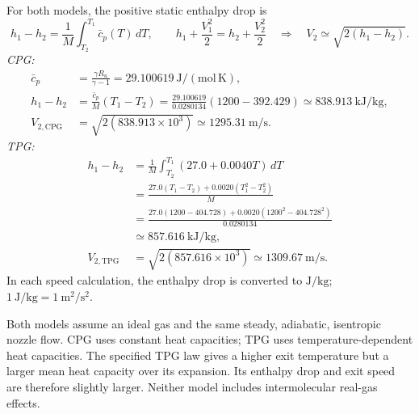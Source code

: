 For both models, the positive static enthalpy drop is
\[
h_1-h_2=\frac{1}{M}\int_{T_2}^{T_1}\bar c_p(T)\,dT,
\qquad
h_1+\frac{V_1^2}{2}=h_2+\frac{V_2^2}{2}
\quad\Longrightarrow\quad V_2\simeq\sqrt{2(h_1-h_2)}.
\]
\textit{CPG:}
\begin{align*}
\bar c_p&=\frac{\gamma R_u}{\gamma-1}
=29.100619\ \mathrm{J/(mol\,K)},\\
h_1-h_2&=\frac{\bar c_p}{M}(T_1-T_2)
=\frac{29.100619}{0.0280134}(1200-392.429)
\simeq\boxed{838.913\ \mathrm{kJ/kg}},\\
V_{2,\mathrm{CPG}}&=\sqrt{2(838.913\times10^3)}
\simeq\boxed{1295.31\ \mathrm{m/s}}.
\end{align*}
\textit{TPG:}
\begin{align*}
h_1-h_2
&=\frac{1}{M}\int_{T_2}^{T_1}(27.0+0.0040T)\,dT\\
&=\frac{27.0(T_1-T_2)+0.0020(T_1^2-T_2^2)}{M}\\
&=\frac{27.0(1200-404.728)+0.0020(1200^2-404.728^2)}{0.0280134}\\
&\simeq\boxed{857.616\ \mathrm{kJ/kg}},\\
V_{2,\mathrm{TPG}}&=\sqrt{2(857.616\times10^3)}
\simeq\boxed{1309.67\ \mathrm{m/s}}.
\end{align*}
In each speed calculation, the enthalpy drop is converted to $\mathrm{J/kg}$;
$1\ \mathrm{J/kg}=1\ \mathrm{m^2/s^2}$.

Both models assume an ideal gas and the same steady, adiabatic, isentropic nozzle flow.
CPG uses constant heat capacities; TPG uses temperature-dependent heat capacities.
The specified TPG law gives a higher exit temperature but a larger mean heat capacity
over its expansion. Its enthalpy drop and exit speed are therefore slightly larger.
Neither model includes intermolecular real-gas effects.
